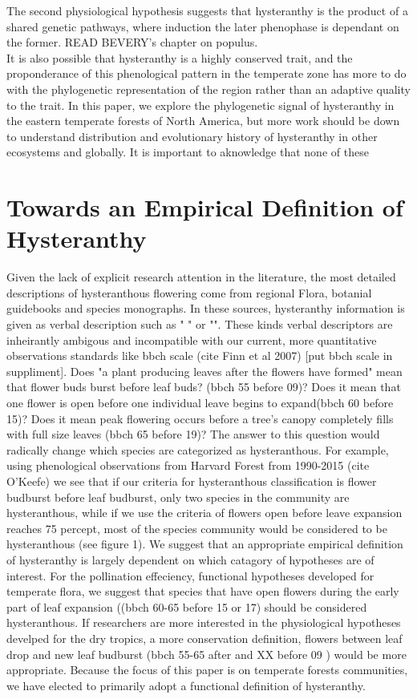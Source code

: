 \documentclass{article}\usepackage[]{graphicx}\usepackage[]{color}
\begin{document}
The second physiological hypothesis suggests that hysteranthy is the product of a shared genetic pathways, where induction the later phenophase is dependant on the former. READ BEVERY's chapter on populus.\\

It is also possible that hysteranthy is a highly conserved trait, and the proponderance of this phenological pattern in the temperate zone has more to do with the phylogenetic representation of the region rather than an adaptive quality to the trait. In this paper, we explore the phylogenetic signal of hysteranthy in the eastern temperate forests of North America, but more work should be down to understand  distribution and evolutionary history of hysteranthy in other ecosystems and globally.
It is important to aknowledge that none of these 

\section*{Towards an Empirical Definition of Hysteranthy}
Given the lack of explicit research attention in the literature, the most detailed descriptions of hysteranthous flowering come from regional Flora, botanial guidebooks and species monographs. In these sources, hysteranthy information is given as verbal description such as "
" or "". These kinds verbal descriptors are inheirantly ambigous and incompatible with our current, more quantitative observations standards like bbch scale (cite Finn et al 2007) [put bbch scale in suppliment]. Does  "a plant producing leaves after the flowers have formed" mean that flower buds burst before leaf buds? (bbch 55 before 09)? Does it mean that one flower is open before one individual leave begins to expand(bbch 60 before 15)? Does it mean peak flowering occurs before a tree's canopy completely fills with full size leaves (bbch 65 before 19)? The answer to this question would radically change which species are categorized as hysteranthous. For example, using phenological observations from Harvard Forest from 1990-2015 (cite O'Keefe) we see that if our criteria for hysteranthous classification is flower budburst before leaf budburst, only two species in the community are hysteranthous, while if we use the criteria of flowers open before leave expansion reaches 75 percept, most of the species community would be considered to be hysteranthous (see figure 1).  We suggest that an appropriate empirical definition of hysteranthy is largely dependent on which catagory of hypotheses are of interest. For the pollination effeciency, functional hypotheses developed for temperate flora, we suggest that species that have open flowers during the early part of leaf expansion ((bbch 60-65 before 15 or 17) should be considered hysteranthous. 
If researchers are more interested in the physiological hypotheses develped for the dry tropics, a more conservation definition, flowers between leaf drop and new leaf budburst (bbch 55-65 after and XX before 09 ) would be more appropriate. Because the focus of this paper is on temperate forests communities, we have elected to primarily adopt a functional definition of hysteranthy.
\end{document}
